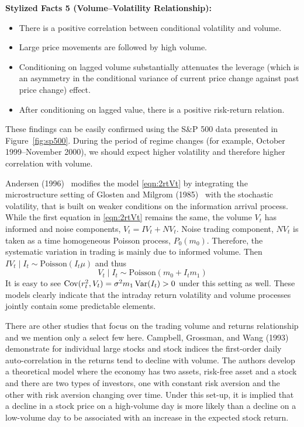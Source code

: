 \noindent\textbf{Stylized Facts 5 (Volume--Volatility Relationship):} 

        \begin{itemize}
        \item  There is a positive correlation between conditional volatility and volume.
        \item Large price movements are followed by high volume.
        \item Conditioning on lagged volume substantially attenuates the leverage (which is an asymmetry in the conditional variance of current price change against past price change) effect.
        \item After conditioning on lagged value, there is a positive risk-return relation.
        \end{itemize}


These findings can be easily confirmed using the S\&P 500 data presented in Figure~\ref{fig:sp500}. During the period of regime changes (for example, October 1999--November 2000), we should expect higher volatility and therefore higher correlation with volume. 


Andersen (1996)~\cite{andersen} modifies the model \eqref{eqn:2rtVt} by integrating the microstructure
setting of Glosten and Milgrom (1985)~\cite{glostenmilgrom} with the stochastic volatility, that is built on weaker conditions on the information arrival process. While the first equation in \eqref{eqn:2rtVt} remains the same, the volume $V_t$ has informed and noise components, $V_t = IV_t + NV_t$. Noise trading component, $NV_t$ is taken as a time homogeneous Poisson process, $P_0(m_0)$. Therefore, the systematic variation in trading is mainly due to informed volume. Then $IV_t \;|\; I_t \sim \text{Poisson}(I_t \mu)$ and thus
	\begin{equation} \label{eqn:2VtIt}
	V_t \;|\; I_t \sim \text{Poisson}(m_0 + I_t m_1)
	\end{equation}
It is easy to see $\operatorname{Cov}(r_t^2,V_t) = \sigma^2 m_1 \operatorname{Var}(I_t) > 0$ under this setting as well. These models clearly indicate that the intraday return volatility and volume processes jointly contain some predictable elements.


There are other studies that focus on the trading volume and returns relationship and we mention only a select few here. Campbell, Grossman, and Wang (1993)~\cite{campbellgross} demonstrate for individual large stocks and stock indices the first-order daily auto-correlation in the returns tend to decline with volume. The authors develop a theoretical model where the economy has two assets, risk-free asset and a stock and there are two types of investors, one with constant risk aversion and the other with risk aversion changing over time. Under this set-up, it is implied that a decline in a stock price on a high-volume day is more likely than a decline on a low-volume day to be associated with an increase in the expected stock return.



